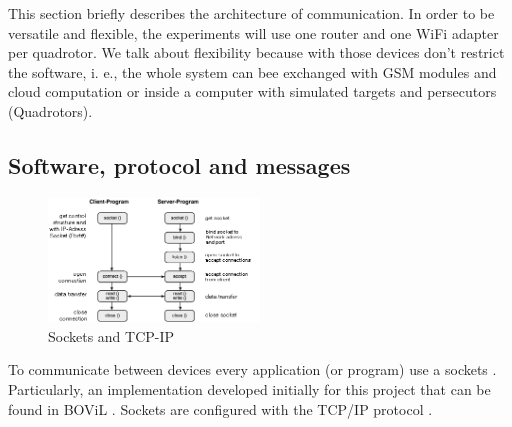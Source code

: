 This section briefly describes the architecture of communication. In order to be versatile and flexible, the experiments will use one router and one WiFi adapter per quadrotor. We talk about flexibility because with those devices don't restrict the software, i. e., the whole system can bee exchanged with GSM modules and cloud computation or inside a computer with simulated targets and persecutors (Quadrotors).

\subsection{Software, protocol and messages}

\begin{figure}
	\begin{center}
		\includegraphics[width=0.5\textwidth, natwidth=448, natheight=263]{../Images/c2/socketstcpip.png}
	\end{center}
	\caption{Sockets and TCP-IP}
	\label{fig:socketstcpip}
\end{figure}

To communicate between devices every application (or program) use a sockets \cite{SocketWiki}. Particularly, an implementation developed initially for this project that can be found in BOViL \cite{BOViL}. Sockets are configured with the TCP/IP protocol \cite{TCPIP}. \\



